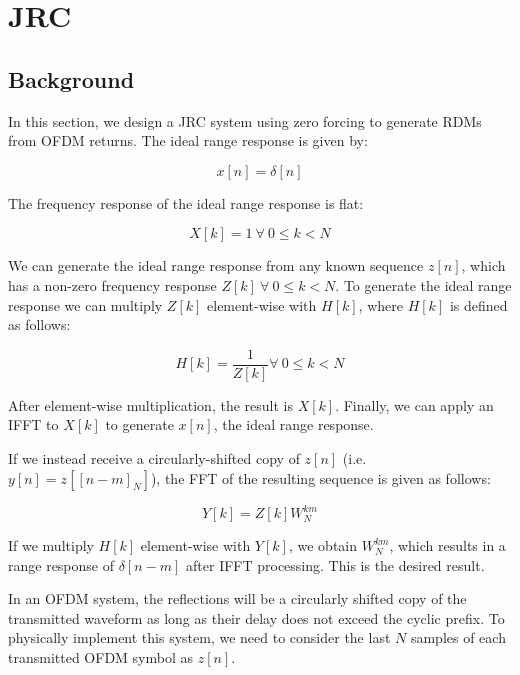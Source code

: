 \documentclass[conference]{IEEEtran}
\begin{document}
    \section {JRC}
		\subsection {Background}

		In this section, we design a JRC system using zero forcing to generate RDMs from OFDM returns. The ideal range response is given by:
		
		\begin{equation}
			x[n] = \delta[n]
		\end{equation}
		
		The frequency response of the ideal range response is flat:
		
		\begin{equation}
			X[k] = 1\ \forall\ 0 \leq k < N 
		\end{equation}
		
		We can generate the ideal range response from any known sequence $z[n]$, which has a non-zero frequency response $Z[k]\ \forall\ 0 \leq k < N$. To generate the ideal range response we can multiply $Z[k]$ element-wise with $H[k]$, where $H[k]$ is defined as follows:
		
		\begin{equation}
			H[k] = \frac{1}{Z[k]} \forall\ 0 \leq k < N
		\end{equation}
		
		After element-wise multiplication, the result is $X[k]$. Finally, we can apply an IFFT to $X[k]$ to generate $x[n]$, the ideal range response.
		
		If we instead receive a circularly-shifted copy of $z[n]$ (i.e. $y[n] = z[[n-m]_N]$), the FFT of the resulting sequence is given as follows:
		
		\begin{equation}
			Y[k] = Z[k]W_N^{km}
		\end{equation}
		
		If we multiply $H[k]$ element-wise with $Y[k]$, we obtain $W_N^{km}$, which results in a range response of $\delta[n-m]$ after IFFT processing. This is the desired result.
		
		In an OFDM system, the reflections will be a circularly shifted copy of the transmitted waveform as long as their delay does not exceed the cyclic prefix. To physically implement this system, we need to consider the last $N$ samples of each transmitted OFDM symbol as $z[n]$.
		
\end{document}

